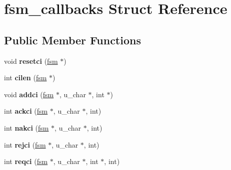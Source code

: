 \hypertarget{structfsm__callbacks}{}\section{fsm\+\_\+callbacks Struct Reference}
\label{structfsm__callbacks}
\subsection*{Public Member Functions}
\begin{DoxyCompactItemize}
\item 
\mbox{\label{structfsm__callbacks_a5f6b6cf92bb01332de81cd5291b29e65}} 
void {\bfseries resetci} (\mbox{\hyperlink{structfsm}{fsm}} $\ast$)
\item 
\mbox{\label{structfsm__callbacks_a31c5e34c366120d3cecbec87b733ee5c}} 
int {\bfseries cilen} (\mbox{\hyperlink{structfsm}{fsm}} $\ast$)
\item 
\mbox{\label{structfsm__callbacks_ae96bac685802455a727883772db7c140}} 
void {\bfseries addci} (\mbox{\hyperlink{structfsm}{fsm}} $\ast$, u\+\_\+char $\ast$, int $\ast$)
\item 
\mbox{\label{structfsm__callbacks_afd3e111dda4d0b886590ed113d3a9924}} 
int {\bfseries ackci} (\mbox{\hyperlink{structfsm}{fsm}} $\ast$, u\+\_\+char $\ast$, int)
\item 
\mbox{\label{structfsm__callbacks_a2e66978c5ad53ef6ee6dbec28bb4b5a9}} 
int {\bfseries nakci} (\mbox{\hyperlink{structfsm}{fsm}} $\ast$, u\+\_\+char $\ast$, int)
\item 
\mbox{\label{structfsm__callbacks_a65359305e617cecdc779c436201a11da}} 
int {\bfseries rejci} (\mbox{\hyperlink{structfsm}{fsm}} $\ast$, u\+\_\+char $\ast$, int)
\item 
\mbox{\label{structfsm__callbacks_a7bd8de3de4c8c37d51fea413bc9d24d6}} 
int {\bfseries reqci} (\mbox{\hyperlink{structfsm}{fsm}} $\ast$, u\+\_\+char $\ast$, int $\ast$, int)
\item 
\mbox{\label{structfsm__callbacks_a9e60ca660accd3633c8fbe654c18e1c9}} 

\end{DoxyCompactItemize}
